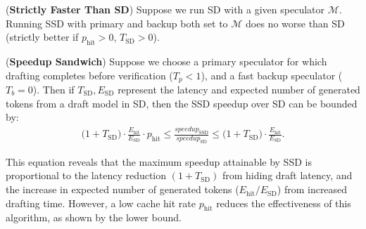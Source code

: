 \begin{corollary} (\textbf{Strictly Faster Than SD})
\label{cor:stricly_faster}
    Suppose we run SD with a given speculator $\mathcal{M}$.
    Running SSD with primary and backup both set to $\mathcal{M}$ does no worse than SD (strictly better if $p_{\mathrm{hit}} > 0$, $T_{\mathrm{SD}} > 0$). 
\end{corollary}


\begin{corollary} (\textbf{Speedup Sandwich})
\label{cor:speedup}
Suppose we choose a primary speculator for which drafting completes before verification ($T_p < 1$), and a fast backup speculator ($T_b = 0$).
Then if $T_{\mathrm{SD}}, E_{\mathrm{SD}}$ represent the latency and expected number of generated tokens from a draft model in SD, then the SSD speedup over SD can be bounded by:
\begin{eqnarray*}
\Big(1 + T_{\mathrm{SD}}\Big) \cdot \frac{E_{\mathrm{hit}}}{E_{\mathrm{SD}}} \cdot p_{\mathrm{hit}} \leq \frac{speedup_{\mathrm{SSD}}}{speedup_{\mathrm{SD}}} \leq \Big(1 + T_{\mathrm{SD}}\Big) \cdot \frac{E_{\mathrm{hit}}}{E_{\mathrm{SD}}}.
\end{eqnarray*}
\end{corollary}
This equation reveals that the maximum speedup attainable by SSD is proportional to the latency reduction $(1+T_{\mathrm{SD}})$ from hiding draft latency, and the increase in expected number of generated tokens ($E_{\mathrm{hit}}/E_{\mathrm{SD}}$) from increased drafting time.
However, a low cache hit rate $p_{\mathrm{hit}}$ reduces the effectiveness of this algorithm, as shown by the lower bound. 






